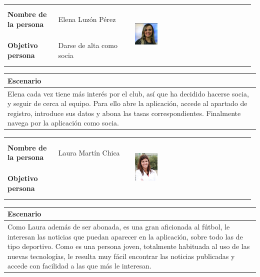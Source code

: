 \documentclass[11pt]{article}
\begin{document}
\begin{table}[H]
  \centering
  \begin{tabular}{p{0.2\linewidth}|p{0.3\linewidth}p{0.475\linewidth}}
    \toprule
    \textbf{Nombre de la persona} & Elena Luzón Pérez &\multirow{2}{*}{\begin{minipage}{1.\textwidth}\includegraphics[width=0.2\textwidth, height=30mm]{Elena}\end{minipage}}\\
    \textbf{Objetivo persona} & Darse de alta como socia & \\
    \bottomrule
  \end{tabular}

\begin{tabular}{p{1.028\linewidth}}
  \textbf{Escenario}\\
  \midrule
  Elena cada vez tiene más interés por el club, así que ha decidido hacerse socia, y seguir de cerca al equipo. Para ello abre la aplicación, accede al apartado de registro, introduce sus datos y abona las tasas correspondientes. Finalmente navega por la aplicación como socia. 
\end{tabular}
\end{table}

\begin{table}[H]
  \centering
  \begin{tabular}{p{0.2\linewidth}|p{0.3\linewidth}p{0.475\linewidth}}
    \toprule
    \textbf{Nombre de la persona} & Laura Martín Chica &\multirow{2}{*}{\begin{minipage}{1.\textwidth}\includegraphics[width=0.2\textwidth, height=30mm]{Ana}\end{minipage}}\\
    \textbf{Objetivo persona} &  & \\
    \bottomrule
  \end{tabular}

\begin{tabular}{p{1.028\linewidth}}
  \textbf{Escenario}\\
  \midrule
  Como Laura además de ser abonada, es una gran aficionada al fútbol, le interesan las noticias que puedan aparecer en la aplicación, sobre todo las de tipo deportivo. Como es una persona joven, totalmente habituada al uso de las nuevas tecnologías, le resulta muy fácil encontrar las noticias publicadas y accede con facilidad a las que más le interesan.
\end{tabular}
\end{table}
\end{document}
